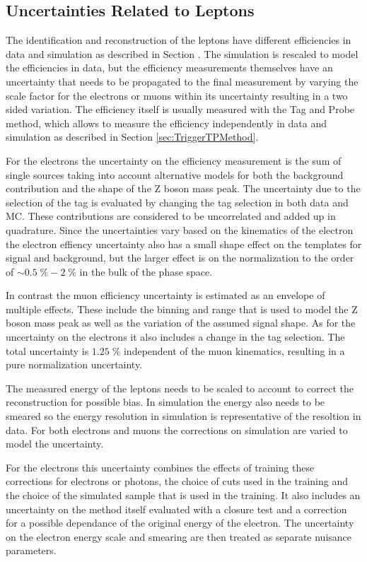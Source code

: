 \subsection{Uncertainties Related to Leptons}

The identification and reconstruction of the leptons have different efficiencies in data and simulation as described in Section .
The simulation is rescaled to model the efficiencies in data, but the efficiency measurements themselves have an uncertainty that needs to be propagated to the final measurement by varying the scale factor for the electrons or muons within its uncertainty resulting in a two sided variation.
The efficiency itself is usually measured with the Tag and Probe method, which allows to measure the efficiency independently in data and simulation as described in Section \ref{sec:TriggerTPMethod}.

For the electrons the uncertainty on the efficiency measurement is the sum of single sources taking into account alternative models for both the background contribution
and the shape of the Z boson mass peak.
The uncertainty due to the selection of the tag is evaluated by changing the tag selection in both data and MC.
These contributions are considered to be uncorrelated and added up in quadrature. 
Since the uncertainties vary based on the kinematics of the electron the electron effiency uncertainty also has a small shape effect on the templates for signal and background, but the larger effect
is on the normalization to the order of $\sim 0.5 \; \% - 2\; \%$ in the bulk of the phase space.

In contrast the muon efficiency uncertainty is estimated as an envelope of multiple effects. These include the binning and range that is used to model the Z boson mass peak as well as the variation of the assumed signal shape. As for the uncertainty on the electrons it also includes a change in the tag selection.
The total uncertainty is $1.25 \; \%$ independent of the muon kinematics, resulting in a pure normalization uncertainty.

The measured energy of the leptons needs to be scaled to account to correct the reconstruction for possible bias. In simulation the energy also needs to be smeared so the energy resolution in simulation is representative of the resoltion in data.
For both electrons and muons the corrections on simulation are varied to model the uncertainty.

For the electrons this uncertainty combines the effects of training these corrections for electrons or photons, the choice of cuts used in the training and the choice of the simulated sample that is used in the training. It also includes an uncertainty on the method itself evaluated with a closure test and a correction for a possible
dependance of the original energy of the electron.
The uncertainty on the electron energy scale and smearing are then treated as separate nuisance parameters.


